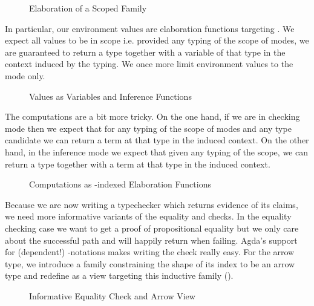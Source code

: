 \begin{figure}[h]
\caption{Elaboration of a Scoped Family}
\end{figure}

In particular, our environment values are elaboration functions targeting . We
expect all values to be in scope i.e. provided any typing of the scope of modes, we are
guaranteed to return a type together with a variable of that type in the context induced
by the typing. We once more limit environment values to the  mode only.

\begin{figure}[h]
\caption{Values as Variables and Inference Functions\label{fig:elabvalues}}
\end{figure}

The computations are a bit more tricky. On the one hand, if we are in checking mode
then we expect that for any typing of the scope of modes and any type candidate we
can  return a term at that type in the induced context. On the other hand,
in the inference mode we expect that given any typing of the scope, we can 
return a type together with a term at that type in the induced context.

\begin{figure}[h]
\caption{Computations as -indexed Elaboration Functions\label{fig:elabcomputations}}
\end{figure}

Because we are now writing a typechecker which returns evidence of its claims, we need
more informative variants of the equality and  checks. In the equality
checking case we want to get a proof of propositional equality but we only care
about the successful path and will happily return  when failing.
Agda's support for (dependent!) -notations makes writing the check
really easy. For the arrow type, we introduce a family  constraining the
shape of its index to be an arrow type and redefine  as a view targeting
this inductive family (\cite{Wadler:1987:VWP:41625.41653}).

\begin{figure}[h]
\begin{minipage}{0.5\textwidth}
\end{minipage}
\begin{minipage}{0.5\textwidth}
\end{minipage}
\caption{Informative Equality Check and Arrow View\label{fig:informativecheck}}
\end{figure}

